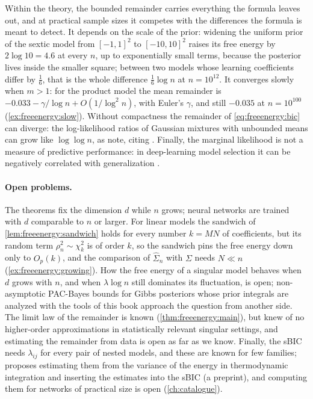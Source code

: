 \begin{refsection}
Within the theory, the bounded remainder carries everything the formula leaves out, and at practical sample sizes it competes with the differences the formula is meant to detect. It depends on the scale of the prior: widening the uniform prior of the sextic model from $[-1,1]^2$ to $[-10,10]^2$ raises its free energy by $2\log10=4.6$ at every $n$, up to exponentially small terms, because the posterior lives inside the smaller square; between two models whose learning coefficients differ by $\frac16$, that is the whole difference $\frac16\log n$ at $n=10^{12}$. It converges slowly when $m>1$: for the product model the mean remainder is $-0.033-\gamma/\log n+O(1/\log^2n)$, with Euler's $\gamma$, and still $-0.035$ at $n=10^{100}$ (\cref{ex:freeenergy:slow}). Without compactness the remainder of \eqref{eq:freeenergy:bic} can diverge: the log-likelihood ratios of Gaussian mixtures with unbounded means can grow like $\log\log n$, as \textcite{DrtonPlummer2017} note, citing \textcite{Hartigan1985}. Finally, the marginal likelihood is not a measure of predictive performance: in deep-learning model selection it can be negatively correlated with generalization \parencite{LotfiEtAl2022}.

\paragraph{Open problems.} The theorems fix the dimension $d$ while $n$ grows; neural networks are trained with $d$ comparable to $n$ or larger. For linear models the sandwich of \cref{lem:freeenergy:sandwich} holds for every number $k=MN$ of coefficients, but its random term $\rho_n^2\sim\chi^2_{k}$ is of order $k$, so the sandwich pins the free energy down only to $O_p(k)$, and the comparison of $\hat\Sigma_n$ with $\Sigma$ needs $N\ll n$ (\cref{ex:freeenergy:growing}). How the free energy of a singular model behaves when $d$ grows with $n$, and when $\lambda\log n$ still dominates its fluctuation, is open; non-asymptotic PAC-Bayes bounds for Gibbs posteriors whose prior integrals are analyzed with the tools of this book \parencite[a 2026 preprint; we rely on its abstract]{WangYang2026} approach the question from another side. The limit law of the remainder is known (\cref{thm:freeenergy:main}), but \textcite[\S2]{DrtonPlummer2017} knew of no higher-order approximations in statistically relevant singular settings, and estimating the remainder from data is open as far as we know. Finally, the sBIC needs $\lambda_{ij}$ for every pair of nested models, and these are known for few families; \textcite{Imai2019a} proposes estimating them from the variance of the energy in thermodynamic integration and inserting the estimates into the sBIC (a preprint), and computing them for networks of practical size is open (\cref{ch:catalogue}).


\end{refsection}
